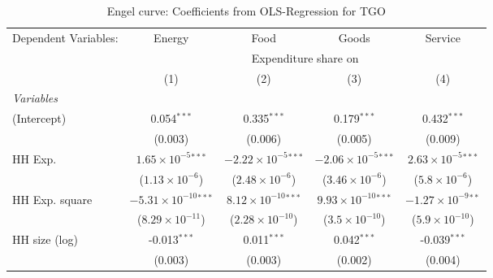 
\begin{table}[htbp!]
   \centering
   \small
   \begin{adjustbox}{width = 1\textwidth, max height = 0.95\textheight, center}
      \begin{threeparttable}[b]
         \caption{\label{tab:Engel_parametric_TGO} Engel curve: Coefficients from OLS-Regression for TGO}
         \begin{tabular}{lcccc}
            \tabularnewline \midrule \midrule
            Dependent Variables: & Energy                          & Food                           & Goods                          & Service\\  
             & \multicolumn{4}{c}{Expenditure share on} \\ 
                                 & (1)                             & (2)                            & (3)                            & (4)\\  
            \midrule
            \emph{Variables}\\
            (Intercept)          & 0.054$^{***}$                   & 0.335$^{***}$                  & 0.179$^{***}$                  & 0.432$^{***}$\\   
                                 & (0.003)                         & (0.006)                        & (0.005)                        & (0.009)\\   
            HH Exp.              & $1.65\times 10^{-5}$$^{***}$    & $-2.22\times 10^{-5}$$^{***}$  & $-2.06\times 10^{-5}$$^{***}$  & $2.63\times 10^{-5}$$^{***}$\\    
                                 & ($1.13\times 10^{-6}$)          & ($2.48\times 10^{-6}$)         & ($3.46\times 10^{-6}$)         & ($5.8\times 10^{-6}$)\\    
            HH Exp. square       & $-5.31\times 10^{-10}$$^{***}$  & $8.12\times 10^{-10}$$^{***}$  & $9.93\times 10^{-10}$$^{***}$  & $-1.27\times 10^{-9}$$^{**}$\\    
                                 & ($8.29\times 10^{-11}$)         & ($2.28\times 10^{-10}$)        & ($3.5\times 10^{-10}$)         & ($5.9\times 10^{-10}$)\\    
            HH size (log)        & -0.013$^{***}$                  & 0.011$^{***}$                  & 0.042$^{***}$                  & -0.039$^{***}$\\   
                                 & (0.003)                         & (0.003)                        & (0.002)                        & (0.004)\\   

\end{tabular}
\end{threeparttable}
\end{adjustbox}
\end{table}
